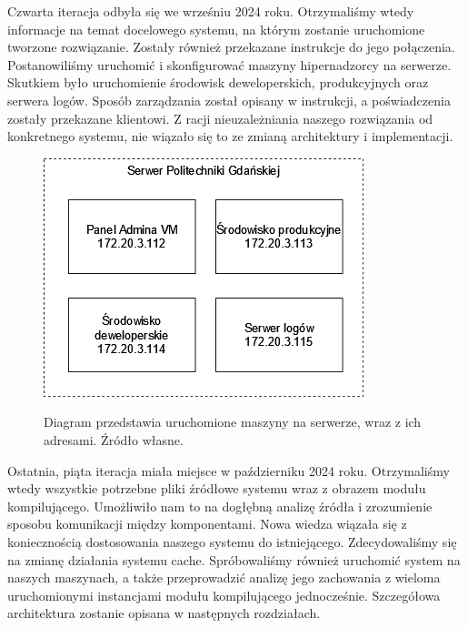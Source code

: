 \indent Czwarta iteracja odbyła się we wrześniu 2024 roku. Otrzymaliśmy wtedy informacje na temat docelowego systemu, na którym zostanie uruchomione tworzone rozwiązanie. Zostały również przekazane instrukcje do jego połączenia. Postanowiliśmy uruchomić i skonfigurować maszyny hipernadzorcy na serwerze. Skutkiem było uruchomienie środowisk deweloperskich, produkcyjnych oraz serwera logów. Sposób zarządzania został opisany w instrukcji, a poświadczenia zostały przekazane klientowi. Z racji nieuzależniania naszego rozwiązania od konkretnego systemu, nie wiązało się to ze zmianą architektury i implementacji. 
\begin{figure}[!h]
	\begin{center}
		\resizebox{0.7\textwidth}{!} {
			\includegraphics{img/1/i4_arch.png}
		}
		\caption[Maszyny wirtualne uruchomione na serwerze Politechniki Gdańskiej]{Diagram przedstawia uruchomione maszyny na serwerze, wraz z ich adresami. Źródło własne.}
	\end{center}
\end{figure}
\indent Ostatnia, piąta iteracja miała miejsce w październiku 2024 roku. Otrzymaliśmy wtedy wszystkie potrzebne pliki źródłowe systemu wraz z obrazem modułu kompilującego. Umożliwiło nam to na dogłębną analizę źródła i zrozumienie sposobu komunikacji między komponentami. Nowa wiedza wiązała się z koniecznością dostosowania naszego systemu do istniejącego. Zdecydowaliśmy się na zmianę działania systemu cache. Spróbowaliśmy również uruchomić system na naszych maszynach, a także przeprowadzić analizę jego zachowania z wieloma uruchomionymi instancjami modułu kompilującego jednocześnie. Szczegółowa architektura zostanie opisana w następnych rozdziałach.